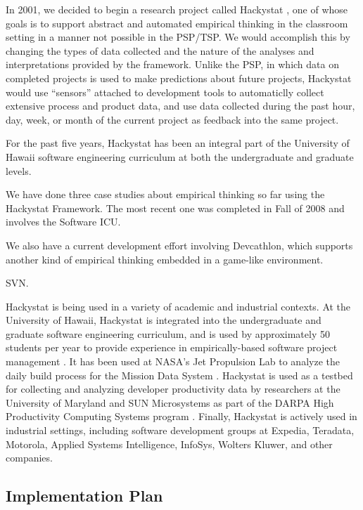 In 2001, we decided to begin a research project called Hackystat
\cite{Hackystat}, one of whose goals is to support abstract and automated
empirical thinking in the classroom setting in a manner not possible in the
PSP/TSP.  We would accomplish this by changing the types of data collected
and the nature of the analyses and interpretations provided by the
framework.  Unlike the PSP, in which data on completed projects is used to
make predictions about future projects, Hackystat would use ``sensors''
attached to development tools to automaticlly collect extensive process and
product data, and use data collected during the past hour, day, week, or
month of the current project as feedback into the same project.

For the past five years, Hackystat has been an integral part of the
University of Hawaii software engineering curriculum at both the
undergraduate and graduate levels.  


We have done three case studies about empirical thinking so far using the Hackystat Framework.  The most recent one was completed in Fall of 2008 and involves the Software ICU.  

We also have a current development effort involving Devcathlon, which supports another kind of empirical thinking embedded in a game-like environment. 

SVN.  

Hackystat is being used in a variety of academic and industrial contexts.
At the University of Hawaii, Hackystat is integrated into the undergraduate
and graduate software engineering curriculum, and is used by approximately
50 students per year to provide experience in empirically-based software
project management \cite{csdl2-03-12}. It has been used at NASA's Jet
Propulsion Lab to analyze the daily build process for the Mission Data
System \cite{csdl2-03-07}.  Hackystat is used as a testbed for collecting
and analyzing developer productivity data by researchers at the University
of Maryland and SUN Microsystems as part of the DARPA High Productivity
Computing Systems program \cite{Hochstein05,csdl2-04-03,csdl2-04-22}.
Finally, Hackystat is actively used in industrial settings, including
software development groups at Expedia, Teradata, Motorola, Applied Systems
Intelligence, InfoSys, Wolters Kluwer, and other companies.

\subsection{Implementation Plan}

